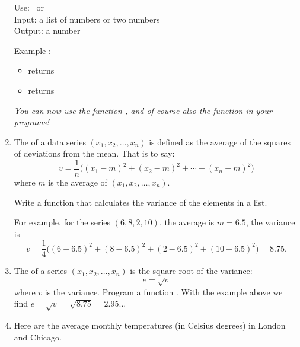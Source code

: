 \documentclass[11pt,class=report,crop=false]{standalone}
\begin{document}
\begin{activite}
\begin{enumerate}
  
  \begin{fonctionpython}
   Use:  \ or \ \\
   Input: a list of numbers or two numbers\\
   Output: a number
  
  \medskip
     
   Example : 
  \begin{itemize}  
    \item {} returns   
    \item {} returns 
  \end{itemize}    

  \end{fonctionpython}   
  
  \emph{You can now use the function , and of course also the function  in your programs!} 
  
  \item The  of a data series $(x_1,x_2,\ldots,x_n)$ is defined as the average of the squares of deviations from the mean. That is to say:
  $$v = \frac{1}{n}\big((x_1-m)^2 + (x_2-m)^2 + \cdots + (x_n-m)^2\big)$$
  where $m$ is the average of $(x_1,x_2,\ldots,x_n)$.
  
  Write a function  that calculates the variance of the elements in a list.
  
  For example, for the series $(6,8,2,10)$, the average is $m = 6.5$, the variance is
  $$v = \frac{1}{4} \big((6-6.5)^2 + (8-6.5)^2 + (2-6.5)^2 + (10-6.5)^2\big) = 8.75.$$
  
  \item The  of a series $(x_1,x_2,\ldots,x_n)$ is the square root of the variance:
  $$e = \sqrt{v}$$
  where $v$ is the variance. Program a function .
  With the example above we find $e = \sqrt{v} = \sqrt{8.75} = 2.95\ldots$
  

  \item Here are the average monthly temperatures (in Celsius degrees) in London and Chicago.


\end{enumerate}
\end{activite}
\end{document}
